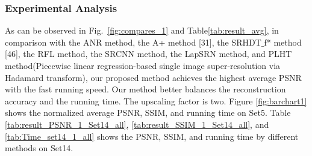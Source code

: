 \documentclass[review,numbers,sort&compress]{elsarticle}  %
\begin{document}
\subsubsection{Experimental Analysis}

As can be observed in Fig.~\ref{fig:compares_1} and Table\ref{tab:result_avg}, in comparison with the ANR method\cite{timofte2013anchored}, the A+ method\cite{timofte2014a+} [31], the SRHDT$\_$f* method\cite{huang2017learning} [46], the RFL method\cite{schulter2015fast}, the SRCNN method\cite{dong2016image}, the LapSRN method\cite{lai2017deep}, and PLHT method(Piecewise linear regression-based single image super-resolution via Hadamard transform)\cite{LUO2018315}, our proposed method achieves the highest average PSNR with the fast running speed. Our method better balances the reconstruction accuracy and the running time. The upscaling factor is two. Figure \ref{fig:barchart1} shows the normalized average PSNR, SSIM, and running time on Set5. Table \ref{tab:result_PSNR_1_Set14_all}, \ref{tab:result_SSIM_1_Set14_all}, and \ref{tab:Time_set14_1_all} shows the PSNR, SSIM, and running time by different methods on Set14.
\end{document}
